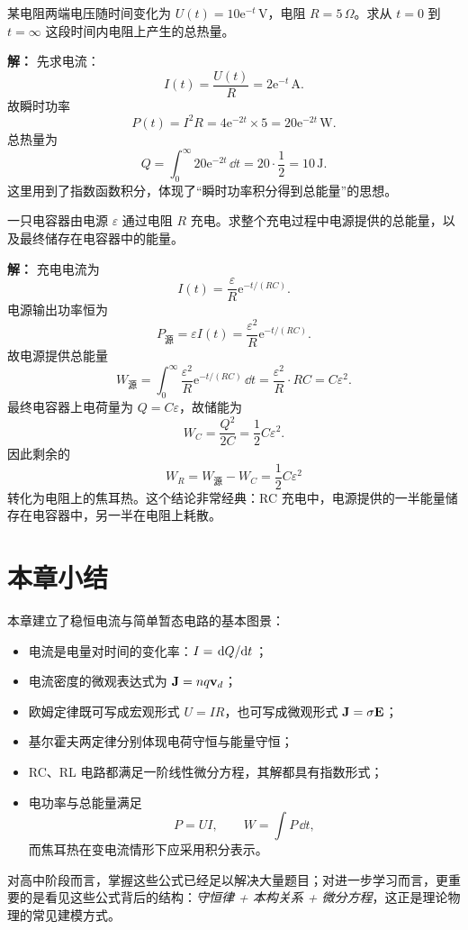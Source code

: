 \begin{example}
某电阻两端电压随时间变化为 $U(t)=10\mathrm{e}^{-t}\,\text{V}$，电阻 $R=5\,\Omega$。求从 $t=0$ 到 $t=\infty$ 这段时间内电阻上产生的总热量。

\textbf{解：}
先求电流：
\[
I(t)=\frac{U(t)}{R}=2\mathrm{e}^{-t}\,\text{A}.
\]
故瞬时功率
\[
P(t)=I^2R=4\mathrm{e}^{-2t}\times 5=20\mathrm{e}^{-2t}\,\text{W}.
\]
总热量为
\[
Q=\int_0^{\infty}20\mathrm{e}^{-2t}\,\dd t
=20\cdot \frac{1}{2}=10\,\text{J}.
\]
这里用到了指数函数积分，体现了“瞬时功率积分得到总能量”的思想。
\end{example}

\begin{example}
一只电容器由电源 $\varepsilon$ 通过电阻 $R$ 充电。求整个充电过程中电源提供的总能量，以及最终储存在电容器中的能量。

\textbf{解：}
充电电流为
\[
I(t)=\frac{\varepsilon}{R}\mathrm{e}^{-t/(RC)}.
\]
电源输出功率恒为
\[
P_{\text{源}}=\varepsilon I(t)=\frac{\varepsilon^2}{R}\mathrm{e}^{-t/(RC)}.
\]
故电源提供总能量
\[
W_{\text{源}}=\int_0^{\infty}\frac{\varepsilon^2}{R}\mathrm{e}^{-t/(RC)}\,\dd t
=\frac{\varepsilon^2}{R}\cdot RC=C\varepsilon^2.
\]
最终电容器上电荷量为 $Q=C\varepsilon$，故储能为
\[
W_C=\frac{Q^2}{2C}=\frac{1}{2}C\varepsilon^2.
\]
因此剩余的
\[
W_R=W_{\text{源}}-W_C=\frac{1}{2}C\varepsilon^2
\]
转化为电阻上的焦耳热。这个结论非常经典：RC 充电中，电源提供的一半能量储存在电容器中，另一半在电阻上耗散。
\end{example}

\section{本章小结}

本章建立了稳恒电流与简单暂态电路的基本图景：
\begin{itemize}
  \item 电流是电量对时间的变化率：$I=\dv*{Q}{t}$；
  \item 电流密度的微观表达式为 $\vb{J}=nq\vb{v}_d$；
  \item 欧姆定律既可写成宏观形式 $U=IR$，也可写成微观形式 $\vb{J}=\sigma\vb{E}$；
  \item 基尔霍夫两定律分别体现电荷守恒与能量守恒；
  \item RC、RL 电路都满足一阶线性微分方程，其解都具有指数形式；
  \item 电功率与总能量满足
  \[
  P=UI,\qquad W=\int P\,\dd t,
  \]
  而焦耳热在变电流情形下应采用积分表示。
\end{itemize}

对高中阶段而言，掌握这些公式已经足以解决大量题目；对进一步学习而言，更重要的是看见这些公式背后的结构：\emph{守恒律 + 本构关系 + 微分方程}，这正是理论物理的常见建模方式。

